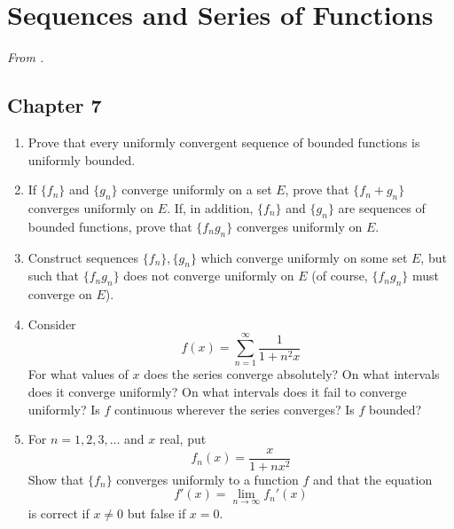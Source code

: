 \documentclass[../psets.tex]{subfiles}
\begin{document}
\section{Sequences and Series of Functions}
\emph{From \textcite{bib:Rudin}.}
\subsection*{Chapter 7}
\begin{enumerate}[label={\textbf{\arabic*.}}]
    \item {}Prove that every uniformly convergent sequence of bounded functions is uniformly bounded.
    \item If $\{f_n\}$ and $\{g_n\}$ converge uniformly on a set $E$, prove that $\{f_n+g_n\}$ converges uniformly on $E$. If, in addition, $\{f_n\}$ and $\{g_n\}$ are sequences of bounded functions, prove that $\{f_ng_n\}$ converges uniformly on $E$.
    \item Construct sequences $\{f_n\},\{g_n\}$ which converge uniformly on some set $E$, but such that $\{f_ng_n\}$ does not converge uniformly on $E$ (of course, $\{f_ng_n\}$ must converge on $E$).
    \item Consider
    \begin{equation*}
        f(x) = \sum_{n=1}^\infty\frac{1}{1+n^2x}
    \end{equation*}
    For what values of $x$ does the series converge absolutely? On what intervals does it converge uniformly? On what intervals does it fail to converge uniformly? Is $f$ continuous wherever the series converges? Is $f$ bounded?
    \setcounter{enumi}{6}
    \item For $n=1,2,3,\dots$ and $x$ real, put
    \begin{equation*}
        f_n(x) = \frac{x}{1+nx^2}
    \end{equation*}
    Show that $\{f_n\}$ converges uniformly to a function $f$ and that the equation
    \begin{equation*}
        f'(x) = \lim_{n\to\infty}f_n'(x)
    \end{equation*}
    is correct if $x\neq 0$ but false if $x=0$.
\end{enumerate}
\end{document}
